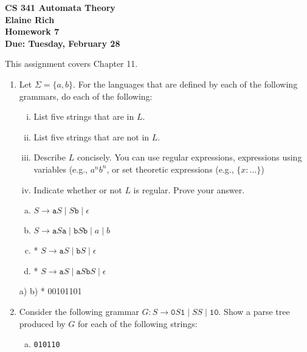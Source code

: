 \documentclass[10pt]{article}
\begin{document}
\begin{center}
\textbf{
CS 341 Automata Theory \\
Elaine Rich \\
Homework 7 \\
Due: Tuesday, February 28}\\
\end{center}
\noindent
This assignment covers Chapter 11. \\

\begin{enumerate}[1)]

\item
Let $\Sigma = \{a, b\}$. For the languages that are defined by each of the following grammars, do each of the following:
\begin{center}
\begin{enumerate}[i.]
\item
List five strings that are in $L$. 

\item
List five strings that are not in $L$.

\item
Describe $L$ concisely.  You can use regular expressions, expressions using variables (e.g., $a^nb^n$, or set theoretic expressions (e.g., $\{x: \ldots\}$)

\item
Indicate whether or not $L$ is regular.  Prove your answer.
\end{enumerate}
\end{center}
\begin{enumerate}[a)]
\item
$S \rightarrow \texttt{a}S \mid S\texttt{b} \mid \epsilon$

\item
$S \rightarrow \texttt{a}S\texttt{a} \mid \texttt{b}S\texttt{b} \mid a \mid b$

\item
* $S \rightarrow \texttt{a}S \mid \texttt{b}S \mid \epsilon$

\item
* $S \rightarrow \texttt{a}S \mid \texttt{a}S\texttt{b}S \mid \epsilon$
\end{enumerate}

a) 
b) * 00101101
\item
Consider the following grammar $G : S \rightarrow \texttt{0}S\texttt{1} \mid SS \mid \texttt{10}$. Show a parse tree produced by $G$ for each of the following strings:
\begin{enumerate}[a)]
\item
\texttt{010110}


\end{enumerate}
\end{enumerate}
\end{document}
